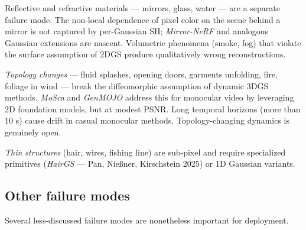 \documentclass{article}
\begin{document}
Reflective and refractive materials --- mirrors, glass, water --- are a separate failure mode. The non-local dependence of pixel color on the scene behind a mirror is not captured by per-Gaussian SH; \emph{Mirror-NeRF} and analogous Gaussian extensions are nascent. Volumetric phenomena (smoke, fog) that violate the surface assumption of 2DGS produce qualitatively wrong reconstructions.

\emph{Topology changes} --- fluid splashes, opening doors, garments unfolding, fire, foliage in wind --- break the diffeomorphic assumption of dynamic 3DGS methods. \emph{MoSca} and \emph{GenMOJO} address this for monocular video by leveraging 2D foundation models, but at modest PSNR. Long temporal horizons (more than \(10\) s) cause drift in casual monocular methods. Topology-changing dynamics is genuinely open.

\emph{Thin structures} (hair, wires, fishing line) are sub-pixel and require specialized primitives (\emph{HairGS} --- Pan, Nießner, Kirschstein 2025) or 1D Gaussian variants.

\subsection{Other failure modes}\label{other-failure-modes}

Several less-discussed failure modes are nonetheless important for deployment.
\end{document}
